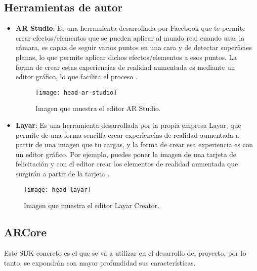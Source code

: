 \subsection{Herramientas de autor}
\begin{itemize}
  \item \textbf{AR Studio}: Es una herramienta desarrollada por Facebook que te permite crear efectos/elementos que se pueden aplicar al mundo real cuando usas la cámara, es capaz de seguir varios puntos en una cara y de detectar superficies planas, lo que permite aplicar dichos efectos/elementos a esos puntos. La forma de crear estas experiencias de realidad aumentada es mediante un editor gráfico, lo que facilita el proceso \cite{ar-studio}.

  \begin{figure}[h]
    \centering
    \texttt{[image: head-ar-studio]}
    \caption{Imagen que muestra el editor AR Studio.\protect\footnotemark}
    \label{figura-arstudio}
  \end{figure}


  \newpage

  \item  \textbf{Layar}: Es una herramienta desarrollada por la propia empresa Layar, que permite de una forma sencilla crear experiencias de realidad aumentada a partir de una imagen que tu cargas, y la forma de crear esa experiencia es con un editor gráfico. Por ejemplo, puedes poner la imagen de una tarjeta de felicitación y con el editor crear los elementos de realidad aumentada que surgirán a partir de la tarjeta \cite{layar}.
\end{itemize}

\begin{figure}[h]
  \centering
  \texttt{[image: head-layar]}
  \caption{Imagen que muestra el editor Layar Creator.\protect\footnotemark}
  \label{figura-layar}
\end{figure}


\subsection{ARCore}
Este SDK concreto es el que se va a utilizar en el desarrollo del proyecto, por lo tanto, se expondrán con mayor profundidad sus características.\\


